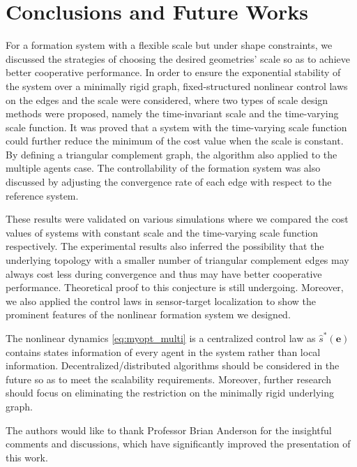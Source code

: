 \documentclass[times]{rncauth}
\begin{document}
\section{Conclusions and Future Works}
For a formation system with a flexible scale but under shape
constraints, we discussed the strategies of choosing the desired
geometries' scale so as to achieve better cooperative performance.
In order to ensure the exponential stability of the system over a minimally rigid graph,
fixed-structured nonlinear control laws on the edges and the scale were considered, where two
types of scale design methods were proposed, namely  the
time-invariant scale and the time-varying scale function.  It was
proved that a system with the time-varying scale function could
further reduce the minimum of the cost value when the scale is
constant. By defining a triangular complement graph, the algorithm
also applied to the multiple agents case. The controllability of the
formation system was also discussed by adjusting the convergence
rate of each edge with respect to the reference system.

These results were validated on various simulations where we
compared the cost values of  systems with constant scale and the
time-varying scale function respectively.  The experimental results
also inferred the possibility that the underlying topology with a
smaller number of triangular complement edges may always cost less
during convergence and thus may have better cooperative performance.
Theoretical proof to this conjecture is still undergoing. Moreover,
we also applied the control laws in sensor-target localization to
show the prominent features of the nonlinear formation system we
designed.

The nonlinear dynamics \eqref{eq:myopt_multi} is a centralized
control law as $\hat{s}^*(\mathbf{e})$ contains states information
of every agent in the system rather than local information.
Decentralized/distributed algorithms should be considered in the
future so as to meet the scalability requirements. Moreover, further
research should focus on eliminating the restriction on the
minimally rigid underlying graph.

\ack The authors would like to thank Professor Brian Anderson for the insightful comments and discussions, which have significantly improved the presentation of this work.



\end{document}
